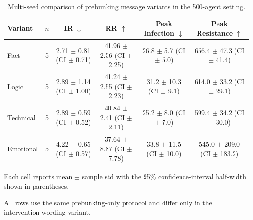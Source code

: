 \begin{table}[t]
\centering
\small
\caption{Multi-seed comparison of prebunking message variants in the 500-agent setting.}
\label{tab:prebunking_variant_macro_results}
\begin{threeparttable}
\begin{tabular}{lccccc}
\toprule
Variant & $n$ & IR $\downarrow$ & RR $\uparrow$ & Peak Infection $\downarrow$ & Peak Resistance $\uparrow$ \\
\midrule
Fact & 5 & 2.71 $\pm$ 0.81 (CI $\pm$ 0.71) & 41.96 $\pm$ 2.56 (CI $\pm$ 2.25) & 26.8 $\pm$ 5.7 (CI $\pm$ 5.0) & 656.4 $\pm$ 47.3 (CI $\pm$ 41.4) \\
Logic & 5 & 2.89 $\pm$ 1.14 (CI $\pm$ 1.00) & 41.24 $\pm$ 2.55 (CI $\pm$ 2.23) & 31.2 $\pm$ 10.3 (CI $\pm$ 9.1) & 614.0 $\pm$ 33.2 (CI $\pm$ 29.1) \\
Technical & 5 & 2.89 $\pm$ 0.59 (CI $\pm$ 0.52) & 40.84 $\pm$ 2.41 (CI $\pm$ 2.11) & 25.2 $\pm$ 8.0 (CI $\pm$ 7.0) & 599.4 $\pm$ 34.2 (CI $\pm$ 30.0) \\
Emotional & 5 & 4.22 $\pm$ 0.65 (CI $\pm$ 0.57) & 37.64 $\pm$ 8.87 (CI $\pm$ 7.78) & 33.8 $\pm$ 11.5 (CI $\pm$ 10.0) & 545.0 $\pm$ 209.0 (CI $\pm$ 183.2) \\
\bottomrule
\end{tabular}
\begin{tablenotes}[flushleft]
\footnotesize
\item Each cell reports mean $\pm$ sample std with the 95\% confidence-interval half-width shown in parentheses.
\item All rows use the same prebunking-only protocol and differ only in the intervention wording variant.
\end{tablenotes}
\end{threeparttable}
\end{table}
